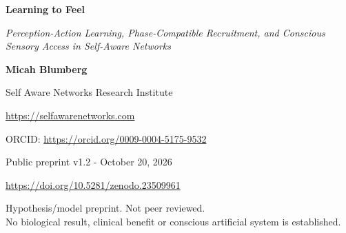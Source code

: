 \documentclass[
  american,
  11pt,
  letterpaper,
]{article}
\author{}
\date{}
\begin{document}
\begin{center}
{\LARGE\bfseries Learning to Feel\par}
\vspace{0.35em}
{\large\itshape Perception-Action Learning, Phase-Compatible Recruitment, and Conscious Sensory Access in Self-Aware Networks\par}
\vspace{0.8em}
{\small\textbf{Micah Blumberg}\par}
{\small Self Aware Networks Research Institute\par}
{\small\url{https://selfawarenetworks.com}\par}
{\small ORCID: \url{https://orcid.org/0009-0004-5175-9532}\par}
{\small Public preprint v1.2 - October 20, 2026\par}
{\small\url{https://doi.org/10.5281/zenodo.23509961}\par}
\end{center}

\begin{center}\small
Hypothesis/model preprint. Not peer reviewed.\\
No biological result, clinical benefit or conscious artificial system is established.
\end{center}
\end{document}
